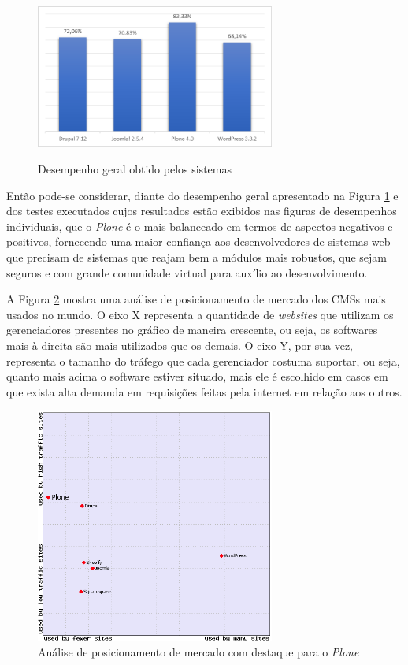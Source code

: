 \begin{figure}[htb]
 \centering
 \caption{Desempenho geral obtido pelos sistemas}
 \includegraphics[width=0.7\textwidth]{figuras/desempenho-geral-cms}
 \label{desempenho-geral}
\end{figure}


Então pode-se considerar, diante do desempenho geral apresentado na Figura \ref{desempenho-geral} e dos testes executados cujos resultados estão exibidos nas figuras de desempenhos individuais, que o \textit{Plone} é o mais balanceado em termos de aspectos negativos e positivos, fornecendo uma maior confiança aos desenvolvedores de sistemas web que precisam de sistemas que reajam bem a módulos mais robustos, que sejam seguros e com grande comunidade virtual para auxílio ao desenvolvimento.

A Figura \ref{uso-plone-mercado} mostra uma análise de posicionamento de mercado dos CMSs mais usados no mundo. O eixo X representa a quantidade de \textit{websites} que utilizam os gerenciadores presentes no gráfico de maneira crescente, ou seja, os softwares mais à direita são mais utilizados que os demais. O eixo Y, por sua vez, representa o tamanho do tráfego que cada gerenciador costuma suportar, ou seja, quanto mais acima o software estiver situado, mais ele é escolhido em casos em que exista alta demanda em requisições feitas pela internet em relação aos outros.

\begin{figure}[htb]
 \centering
 \caption{Análise de posicionamento de mercado com destaque para o \textit{Plone}}
 \includegraphics[width=0.7\textwidth]{figuras/cms_mercado}
 
 \label{uso-plone-mercado}
\end{figure}

